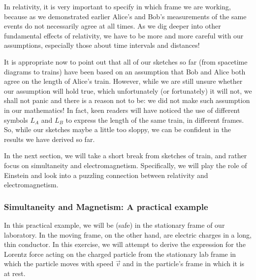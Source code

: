 \documentclass[a4paper,11pt]{article}
\numberwithin{equation}{section}
\begin{document}
 \noindent In relativity, it is very important to specify in which frame we are working, because as we demonstrated earlier Alice's and Bob's measurements of the same events do not necessarily agree at all times. As we dig deeper into other fundamental effects of relativity, we have to be more and more careful with our assumptions, especially those about time intervals and distances! 
 
 \noindent It is appropriate now to point out that all of our sketches so far (from spacetime diagrams to trains) have been based on an assumption that Bob and Alice both agree on the length of Alice's train. However, while we are still unsure whether our assumption will hold true, which unfortunately (or fortunately) it will not, we shall not panic and there is a reason not to be: we did not make such assumption in our mathematics! In fact, keen readers will have noticed the use of different symbols $L_{A}$ and $L_{B}$ to express the length of the same train, in different frames. So, while our sketches maybe a little too sloppy, we can be confident in the results we have derived so far. 
 
 \noindent In the next section, we will take a short break from sketches of train, and rather focus on simultaneity and electromagnetism. Specifically, we will play the role of Einstein and look into a puzzling connection between relativity and electromagnetism. 
 \subsubsection{Simultaneity and Magnetism: A practical example}
 
 In this practical example, we will be (safe) in the stationary frame of our laboratory. In the moving frame, on the other hand, are electric charges in a long, thin conductor. In this exercise, we will attempt to derive the expression for the Lorentz force acting on the charged particle from the stationary lab frame in which the particle moves with speed $\vec{v}$ and in the particle's frame in which it is at rest.
 
\end{document}
